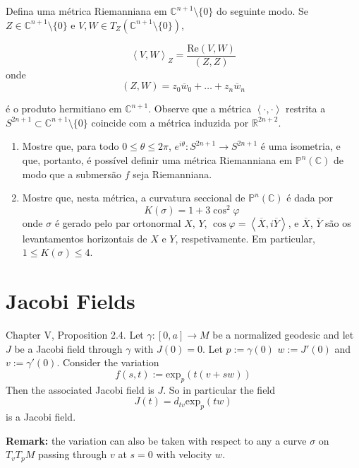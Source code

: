 \begin{example}
\label{example-curvature-of-CPn}
Defina uma métrica Riemanniana  em $\mathbb{C}^{n+1}\setminus\{0\}$ do
seguinte modo. Se $Z \in \mathbb{C}^{n+1}\setminus\{0\}$ e $V,W \in T_Z
(\mathbb{C}^{n+1}\setminus\{0\})$,

$$
\left<V,W\right>_Z=\frac{\text{Re}(V,W)}{(Z,Z)}
$$
onde 
$$
(Z,W)=z_0\overline{w}_0+\ldots+z_n\overline{w}_n
$$

é o produto hermitiano em $\mathbb{C}^{n+1}$. Observe que a métrica
$\left<\cdot,\cdot\right>$ restrita a $S^{2n+1}\subset
\mathbb{C}^{n+1}\setminus\{0\}$ coincide com a métrica induzida por
$\mathbb{R}^{2n+2}$.
\begin{enumerate}

\item Mostre que, para todo $0\leq \theta \leq 2\pi$, $e^{i\theta}:S^{2n+1}\to
S^{2n+1}$ é uma isometria, e que, portanto, é possível definir uma métrica
Riemanniana em $\mathbb{P}^n(\mathbb{C})$ de modo que a submersão $f$ seja
Riemanniana.

\item Mostre que, nesta métrica, a curvatura seccional de
$\mathbb{P}^n(\mathbb{C})$ é dada por
$$
K(\sigma)=1+3\cos^2\varphi
$$
onde $\sigma$ é gerado pelo par ortonormal $X$, $Y$, $\cos
\varphi=\left<\overline{X},i\overline{Y}\right>$, e $\overline{X}$,
$\overline{Y}$ são os levantamentos horizontais de $X$ e $Y$, respetivamente. Em
particular, $1 \leq  K(\sigma) \leq  4$.
\end{enumerate}
\end{example}

\section{Jacobi Fields}
\label{section-jacobi-fields}

\begin{proposition}
\label{proposition-everyday-jacobi-field}
\cite{doc} Chapter V, Proposition 2.4. Let $\gamma:[0,a]\to M$ be a normalized
geodesic and let $J$ be a Jacobi field through $\gamma$ with $J(0)=0$.
Let $p:=\gamma(0)$ $w:=J'(0)$ and  $v:=\gamma'(0)$. 
Consider the variation
$$
f(s,t):=\text{exp}_{p}(t(v+sw))
$$
Then the associated Jacobi field is $J$. So in particular the field
$$
J(t)=d_{tv}\text{exp}_p(tw)
$$
is a Jacobi field.

{\bf Remark:} the variation can also be taken with respect to
any a curve $\sigma$ on $T_vT_{p}M$ passing through $v$ 
at $s=0$ with velocity $w$.
\end{proposition}

